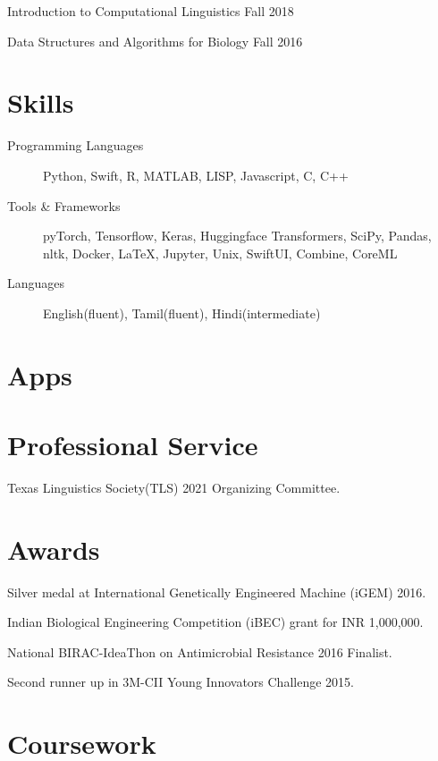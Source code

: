 \documentclass[10pt,a4paper]{mycv}
\begin{document}
Introduction to Computational Linguistics \hfill Fall 2018

Data Structures and Algorithms for Biology \hfill Fall 2016

\section{Skills}

\begin{description}
\item[Programming Languages] Python, Swift, R, MATLAB, LISP, Javascript, C, C++

\item[Tools \& Frameworks] pyTorch, Tensorflow, Keras, Huggingface Transformers, SciPy, Pandas, nltk, Docker, \LaTeX, Jupyter, Unix, SwiftUI, Combine, CoreML

\item[Languages] English(fluent), Tamil(fluent), Hindi(intermediate)
\end{description}


\section{Apps}


\section{Professional Service}

Texas Linguistics Society(TLS) 2021 Organizing Committee.

\section{Awards}

Silver medal at International Genetically Engineered Machine (iGEM) 2016.

Indian Biological Engineering Competition (iBEC) grant for INR 1,000,000.

National BIRAC-IdeaThon on Antimicrobial Resistance 2016 Finalist.

Second runner up in 3M-CII Young Innovators Challenge 2015.

\section{Coursework}
\end{document}
